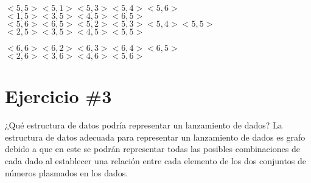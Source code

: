 \documentclass{article}
\begin{document}
\setlength{\parindent}{0cm}
$<5,5>$\hspace{1.7cm}$<5,1> <5,3> <5,4> <5,6>$\hspace{0.5cm}$<1,5><3,5><4,5><6,5>$\\
$<5,6><6,5>$\hspace{0.5cm}$<5,2><5,3><5,4><5,5>$\hspace{0.5cm}$<2,5><3,5><4,5><5,5>$\\
\noindent

\setlength{\parindent}{0cm}
$<6,6>$\hspace{1.7cm}$<6,2><6,3><6,4><6,5>$\hspace{0.5cm}$<2,6><3,6><4,6><5,6>$\\
\noindent

\section*{Ejercicio \#3}
¿Qué estructura de datos podría representar un lanzamiento de dados?
La estructura de datos adecuada para representar un lanzamiento de dados es grafo debido a que en este se podrán representar todas las posibles combinaciones de cada dado al establecer una relación entre cada elemento de los dos conjuntos de números plasmados en los dados.\\
\end{document}

